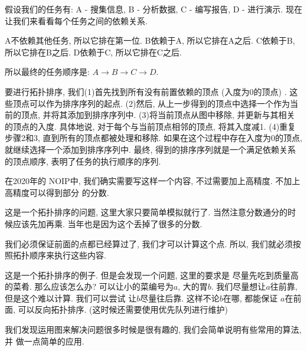 假设我们的任务有: A - 搜集信息, B - 分析数据, C - 编写报告, D - 进行演示. 
现在让我们来看看每个任务之间的依赖关系. 

A不依赖其他任务, 所以它排在第一位. 
B依赖于A, 所以它排在A之后. 
C依赖于B, 所以它排在B之后. 
D依赖于C, 所以它排在C之后. 

所以最终的任务顺序是: $A \rightarrow  B \rightarrow  C \rightarrow  D$. 

要进行拓扑排序, 我们(1)首先找到所有没有前置依赖的顶点 (入度为0的顶点) . 
这些顶点可以作为排序序列的起点. (2)然后, 从上一步得到的顶点中选择一个作为当
前的顶点, 并将其添加到排序序列中. (3)将当前顶点从图中移除, 
并更新与其相关的顶点的入度. 具体地说, 对于每个与当前顶点相邻的顶点, 将其入度减1. 
(4)重复步骤2和3, 直到所有的顶点都被处理和移除. 
如果在这个过程中存在入度为0的顶点, 就继续选择一个添加到排序序列中. 
最终, 得到的排序序列就是一个满足依赖关系的顶点顺序, 表明了任务的执行顺序的序列.

在2020年的
NOIP中, 我们确实需要写这样一个内容, 不过需要加上高精度. 不加上高精度可以得到部分
的分数. 

 这是一个拓扑排序的问题, 这里大家只要简单模拟就行了. 
当然注意分数通分的时候应该先加再乘. 当年也是因为这个丢掉了很多的分数. 

 我们必须保证前面的点都已经算过了, 我们才可以计算这个点. 
所以, 我们就必须按照拓扑顺序来执行这些内容.

 这是一个拓扑排序的例子. 但是会发现一个问题, 这里的要求是
尽量先吃到质量高的菜肴. 那么应该怎么办? 可以让小的菜编号为$a$, 
大的胃$b$. 我们尽量想让$a$往前靠, 但是这个难以计算. 我们可以尝试
让$b$尽量往后靠. 这样不论$b$在哪, 都能保证
$a$在前面, 可以反向拓扑排序. (这时候还需要使用优先队列进行维护) 

我们发现运用图来解决问题很多时候是很有趣的, 我们会简单说明有些常用的算法, 并
做一点简单的应用. 
